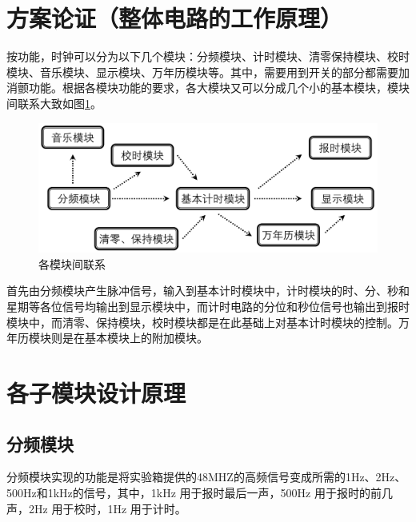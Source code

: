 \documentclass[12pt]{article}
\begin{document}
\section{方案论证（整体电路的工作原理）}
按功能，时钟可以分为以下几个模块：分频模块、计时模块、清零保持模块、校时模块、音乐模块、显示模块、万年历模块等。其中，需要用到开关的部分都需要加消颤功能。根据各模块功能的要求，各大模块又可以分成几个小的基本模块，模块间联系大致如图\ref{fig:lianxi}。\par
\begin{figure}[htbp]%
	\centering  %
	\includegraphics[width=\textwidth]{picture/all.png}  %
	\caption{各模块间联系}  %
	\label{fig:lianxi}   %
\end{figure}
首先由分频模块产生脉冲信号，输入到基本计时模块中，计时模块的时、分、秒和星期等各位信号均输出到显示模块中，而计时电路的分位和秒位信号也输出到报时模块中，而清零、保持模块，校时模块都是在此基础上对基本计时模块的控制。万年历模块则是在基本模块上的附加模块。
\section{各子模块设计原理}

\subsection{分频模块}
分频模块实现的功能是将实验箱提供的48MHZ的高频信号变成所需的1Hz、2Hz、500Hz和1kHz的信号，其中，1kHz 用于报时最后一声，500Hz 用于报时的前几声，2Hz 用于校时，1Hz 用于计时。
\end{document}
